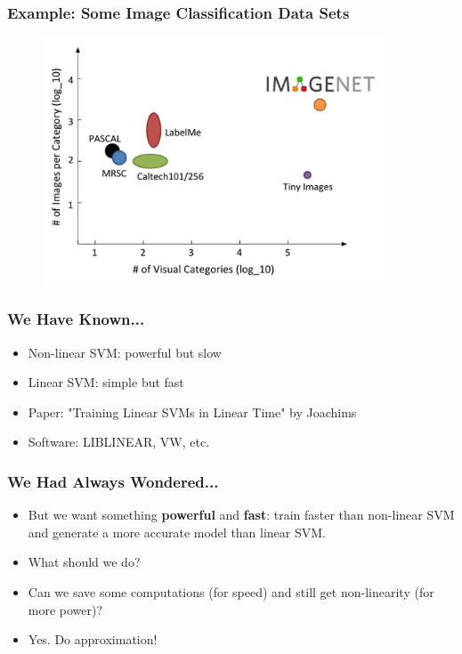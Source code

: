 \documentclass{beamer}
\def\liblinear{{{\sf LIBLINEAR}\xspace}}
\def\vw{{\sf VW}\xspace}
\begin{document}
\begin{frame}
  \frametitle{Example: Some Image Classification Data Sets}
  \begin{figure}
  \includegraphics[width=4in]{tasks_summary.png}\\
  \end{figure}
\end{frame}

\begin{frame}
  \frametitle{We Have Known...}
  \begin{itemize}
    \item Non-linear SVM: powerful but slow 
    \item Linear SVM: simple but fast  
    \item [] Paper: "Training Linear SVMs in Linear Time" by Joachims
    \item [] Software: \liblinear, \vw, etc.
 \end{itemize}
\end{frame}

\begin{frame}
  \frametitle{We Had Always Wondered...}
  \begin{itemize}
    \item But we want something {\bf powerful} and {\bf fast}: train faster than non-linear SVM and generate a more accurate model than linear SVM.
    \pause
    \item [] What should we do? 
    \pause
    \item Can we save some computations (for speed) and still get non-linearity (for more power)?
    \pause
    \item [] Yes. Do approximation!
  \end{itemize}
\end{frame}
\end{document}

